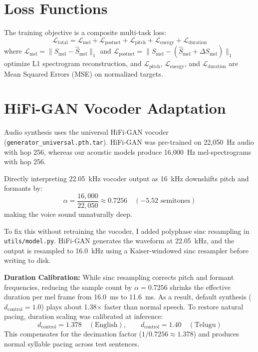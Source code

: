 \documentclass[11pt,a4paper]{report}
\begin{document}
\section{Loss Functions}
The training objective is a composite multi-task loss:
\begin{equation}
    \mathcal{L}_{\text{total}} = \mathcal{L}_{\text{mel}} + \mathcal{L}_{\text{postnet}} + \mathcal{L}_{\text{pitch}} + \mathcal{L}_{\text{energy}} + \mathcal{L}_{\text{duration}}
\end{equation}
where $\mathcal{L}_{\text{mel}} = \|S_{\text{mel}} - \hat{S}_{\text{mel}}\|_1$ and $\mathcal{L}_{\text{postnet}} = \|S_{\text{mel}} - (\hat{S}_{\text{mel}} + \Delta S_{\text{mel}})\|_1$ optimize L1 spectrogram reconstruction, and $\mathcal{L}_{\text{pitch}}$, $\mathcal{L}_{\text{energy}}$, and $\mathcal{L}_{\text{duration}}$ are Mean Squared Errors (MSE) on normalized targets.

\section{HiFi-GAN Vocoder Adaptation}
Audio synthesis uses the universal HiFi-GAN vocoder~\cite{hifigan} (\texttt{generator\_universal.pth.tar}). HiFi-GAN was pre-trained on 22{,}050~Hz audio with hop 256, whereas our acoustic models produce 16{,}000~Hz mel-spectrograms with hop 256. 

Directly interpreting 22.05~kHz vocoder output as 16~kHz downshifts pitch and formants by:
\begin{equation}
    \alpha = \frac{16{,}000}{22{,}050} \approx 0.7256 \quad (-5.52\text{ semitones})
\end{equation}
making the voice sound unnaturally deep.

To fix this without retraining the vocoder, I added polyphase sinc resampling in \texttt{utils/model.py}. HiFi-GAN generates the waveform at 22.05~kHz, and the output is resampled to 16.0~kHz using a Kaiser-windowed sinc resampler before writing to disk.

\textbf{Duration Calibration:} While sinc resampling corrects pitch and formant frequencies, reducing the sample count by $\alpha = 0.7256$ shrinks the effective duration per mel frame from 16.0~ms to 11.6~ms. As a result, default synthesis ($d_{\text{control}} = 1.0$) plays about 1.38$\times$ faster than normal speech. To restore natural pacing, duration scaling was calibrated at inference:
\begin{equation}
    d_{\text{control}} = 1.378 \quad (\text{English}), \qquad d_{\text{control}} = 1.40 \quad (\text{Telugu})
\end{equation}
This compensates for the decimation factor ($1 / 0.7256 \approx 1.378$) and produces normal syllable pacing across test sentences.
\end{document}
